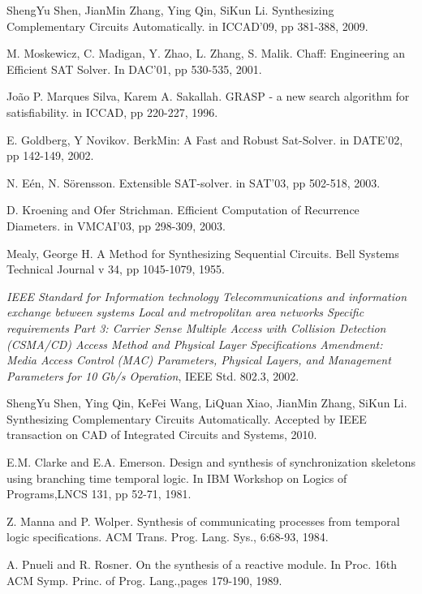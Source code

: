 \documentclass[journal]{IEEEtran}
\begin{document}
\begin{thebibliography}{1}

ShengYu Shen, JianMin Zhang, Ying Qin, SiKun Li.
Synthesizing Complementary Circuits Automatically.
in ICCAD'09,
pp 381-388,
2009.

M. Moskewicz, C. Madigan, Y. Zhao, L. Zhang, S. Malik.
Chaff: Engineering an Efficient SAT Solver.
In DAC'01,
pp 530-535,
2001.

Jo\~ao P. Marques Silva, Karem A. Sakallah.
GRASP - a new search algorithm for satisfiability.
in ICCAD,
pp 220-227,
1996.

E. Goldberg, Y Novikov.
BerkMin: A Fast and Robust Sat-Solver.
in DATE'02,
pp 142-149,
2002.

N. E\'en, N. S\"orensson.
Extensible SAT-solver.
in SAT'03,
pp 502-518,
2003.

D. Kroening and Ofer Strichman.
Efficient Computation of Recurrence Diameters.
in VMCAI'03,
pp 298-309,
2003.

Mealy, George H.
A Method for Synthesizing Sequential Circuits.
Bell Systems Technical Journal v 34, pp 1045-1079, 1955.

\emph{IEEE Standard for Information technology Telecommunications and
  information exchange between systems Local and metropolitan area networks
  Specific requirements Part 3: Carrier Sense Multiple Access with Collision
  Detection (CSMA/CD) Access Method and Physical Layer Specifications
  Amendment: Media Access Control (MAC) Parameters, Physical Layers, and
  Management Parameters for 10 Gb/s Operation}, IEEE Std. 802.3, 2002.

ShengYu Shen, Ying Qin, KeFei Wang, LiQuan Xiao, JianMin Zhang, SiKun Li.
Synthesizing Complementary Circuits Automatically.
Accepted by IEEE transaction on CAD of Integrated Circuits and Systems,
2010.

E.M. Clarke and E.A. Emerson.
Design and synthesis of synchronization skeletons using branching time temporal logic.
In IBM Workshop on Logics of Programs,LNCS 131,
pp 52-71,
1981.

Z. Manna and P. Wolper.
Synthesis of communicating processes from temporal logic specifications.
ACM Trans. Prog. Lang. Sys., 6:68-93, 1984.

A. Pnueli and R. Rosner.
On the synthesis of a reactive module.
In Proc. 16th ACM Symp. Princ. of Prog. Lang.,pages 179-190, 1989.


\end{thebibliography}
\end{document}

